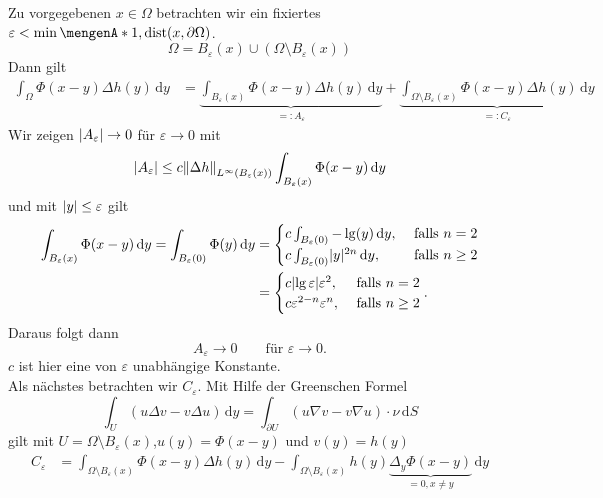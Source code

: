 \begin{beweis}
	Zu vorgegebenen $x \in \Omega$ betrachten wir ein fixiertes $\varepsilon < \min \set{1,\dist(x, \partial \Omega)}$.
	\[
		\Omega = B_{\varepsilon}(x) \cup (\Omega \setminus B_{\varepsilon}(x))
	\]
	Dann gilt
	\begin{align*}
		\int_{\Omega}^{} \Phi(x-y) \Delta h(y) \,\mathrm{d}y 
		&= \underset{=:A_{\varepsilon}}{\underbrace{\int_{B_{\varepsilon}(x)}^{} \Phi(x-y) \Delta h(y) \,\mathrm{d}y }}
		+ \underset{=:C_{\varepsilon}}{\underbrace{\int_{ \Omega \setminus B _{\varepsilon}(x)}^{} \Phi(x-y) \Delta h(y) \,\mathrm{d}y}}
	\end{align*}
	Wir zeigen $\lvert A _{\varepsilon}\rvert\to 0$ für $\varepsilon \to 0$ mit
	\begin{equation}
		\abs{A_{\varepsilon}} \leq c \norm{\Delta h}_{L^{\infty}(B_{\varepsilon}(x))} \int_{B_{\varepsilon}(x)}^{}\Phi(x-y) \,\mathrm{d}y
	\end{equation}
	und mit $\lvert y\rvert \leq \varepsilon$ gilt
	\begin{align}
		\int_{B_{\varepsilon}(x)}^{}\Phi(x-y) \,\mathrm{d}y = \int_{B_{\varepsilon}(0)}^{} \Phi(y) \,\mathrm{d}y &= \begin{cases}
			c \int_{B_{\varepsilon}(0)}^{} -\lg(y) \,\mathrm{d}y, &\text{ falls } n =2\\
			c \int_{B_{\varepsilon}(0)}^{} \lvert y\rvert^{2n} \,\mathrm{d}y , &\text{ falls } n \geq 2
			\end{cases} \\
			&= \begin{cases}
				c \lvert\lg \varepsilon\rvert \varepsilon^2, &\text{ falls }n=2\\
				c \varepsilon^{2-n} \varepsilon^n, &\text{ falls }n \geq 2\\
			\end{cases}.
	\end{align}
	Daraus folgt dann \[
		A_{\varepsilon} \to 0 \qquad \text{für }\varepsilon \to 0.
	\]
	$c$ ist hier eine von $\varepsilon$ unabhängige Konstante. \\
	Als nächstes betrachten wir $C_{\varepsilon}$. Mit Hilfe der Greenschen Formel 
	\[
		\int_{U}^{} ( u \Delta v - v \Delta u) \,\mathrm{d}y = \int_{\partial U}^{}(u  \nabla  v - v  \nabla u) \cdot \nu \,\mathrm{d}S
	\]
	gilt mit $U = \Omega \setminus B _{\varepsilon}(x)$,$u(y) = \Phi(x-y)$ und $v(y)= h(y)$
	\begin{align*}
		C _{\varepsilon} &= \int_{\Omega \setminus B _{\varepsilon}(x)}^{} \Phi(x-y) \Delta h(y)  \,\mathrm{d}y
		 - \int_{\Omega \setminus B _{\varepsilon}(x)}^{} h(y) \underset{=0, x \neq y}{\underbrace{\Delta_y \Phi(x-y)}} \,\mathrm{d}y \\

\end{align*}
\end{beweis}
